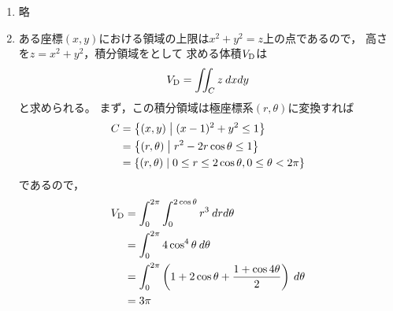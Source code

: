 \begin{ans*}
  ${}$
  \begin{enumerate}[label=(\arabic*)]
    \item 略 %
    \item ある座標$(x,y)$における領域の上限は$x^2+y^2=z$上の点であるので，
    高さを$z=x^2 + y^2$，積分領域をとして
    求める体積$V_{\rm{D}}$は
    \begin{gather}
      V_{\rm{D}} = \iint_C z \:dxdy
    \end{gather}
    と求められる。
    まず，この積分領域は極座標系$(r,\theta)$に変換すれば
    \begin{align}
      C 
      &= \left\{(x,y)\relmiddle (x-1)^2 + y^2 \leq 1 \right\} \\
      &= \left\{(r,\theta)\relmiddle r^2 - 2r\cos\theta\leq 1 \right\} \\
      &= \left\{(r,\theta)\relmiddle 0\leq r\leq 2\cos\theta, 0\leq \theta < 2\pi \right\}
    \end{align}
    であるので，
    \begin{align}
      V_{\rm{D}}
      &= \int_{0}^{2\pi}\int_{0}^{2\cos\theta}r^3\:drd\theta \\
      &= \int_{0}^{2\pi} 4\cos^4\theta\:d\theta \\
      &= \int_{0}^{2\pi} \left(1 + 2\cos\theta + \frac{1 + \cos4\theta}{2}\right)\:d\theta \\
      &= 3\pi
    \end{align}
  \end{enumerate}
  
\end{ans*}


